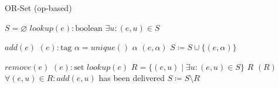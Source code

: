\begin{algorithm}[t]
\small{
	\caption{OR-Set (op-based)}
 	\label{alg:or_set_op_based}                       

 	\begin{algorithmic}[1]
 	  \State \Payload $S = \varnothing$
 	  \State \Query $lookup(e) : \text{boolean}$
 	  \State \hspace{\algorithmicindent} \Return $\exists u : (e, u) \in S$
 	  
 	  \State \Update $add(e)$
 	  \State \hspace{\algorithmicindent} \Prepare $(e) : \text{tag}$
 	  \State \hspace{\algorithmicindent}\hspace{\algorithmicindent} \Let $\alpha = unique()$
 	  \State \hspace{\algorithmicindent}\hspace{\algorithmicindent} \Return $\alpha$
 	  \State \hspace{\algorithmicindent} \Effect $(e, \alpha)$ 
 	  \State \hspace{\algorithmicindent}\hspace{\algorithmicindent} $S \coloneqq S \cup \{(e, \alpha)\}$
 	  
 	  \State \Update $remove(e)$
 	  \State \hspace{\algorithmicindent} \Prepare $(e) : \text{set}$
 	  \State \hspace{\algorithmicindent}\hspace{\algorithmicindent} \Pre $lookup(e)$
 	  \State \hspace{\algorithmicindent}\hspace{\algorithmicindent} \Let $R = \{(e, u) \mid \exists u : (e, u) \in S\}$
 	  \State \hspace{\algorithmicindent}\hspace{\algorithmicindent} \Return $R$
 	  \State \hspace{\algorithmicindent} \Effect $(R)$ 
 	  \State \hspace{\algorithmicindent}\hspace{\algorithmicindent} \Pre $\forall (e, u) \in R : add(e, u)$ has been delivered
 	  \State \hspace{\algorithmicindent}\hspace{\algorithmicindent} $S \coloneqq S \setminus R$
	\end{algorithmic}
 }
\end{algorithm}
